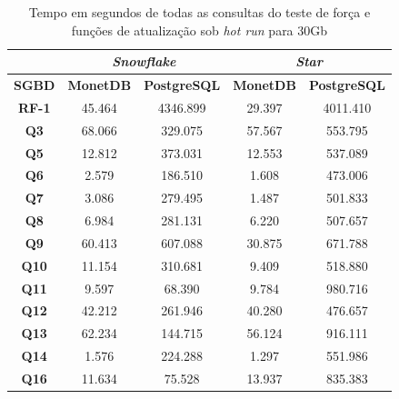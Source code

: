 \begin{table}[t]
        \centering
        \caption{Tempo em segundos de todas as consultas do teste de força e funções de atualização sob \textit{hot run} para 30Gb}
        \label{tab:queries_hot_30}
        \begin{tabular}{|c|c|c|c|c|}
        \hline
                & \multicolumn{2}{c|}{\textit{\textbf{Snowflake}}} & \multicolumn{2}{c|}{\textit{\textbf{Star}}} \\ \hline
        \textbf{SGBD}  & \textbf{MonetDB}      & \textbf{PostgreSQL}      & \textbf{MonetDB}    & \textbf{PostgreSQL}   \\ \hline
        \textbf{RF-1}  & 45.464            & 4346.899            & 29.397           & 4011.410            \\ \hline
        \textbf{Q3}    & 68.066            & 329.075             & 57.567           & 553.795             \\ \hline
        \textbf{Q5}    & 12.812            & 373.031             & 12.553           & 537.089             \\ \hline
        \textbf{Q6}    & 2.579             & 186.510             & 1.608            & 473.006             \\ \hline
        \textbf{Q7}    & 3.086             & 279.495             & 1.487            & 501.833             \\ \hline
        \textbf{Q8}    & 6.984             & 281.131             & 6.220            & 507.657             \\ \hline
        \textbf{Q9}    & 60.413            & 607.088             & 30.875           & 671.788             \\ \hline
        \textbf{Q10}   & 11.154            & 310.681             & 9.409            & 518.880             \\ \hline
        \textbf{Q11}   & 9.597             & 68.390              & 9.784            & 980.716             \\ \hline
        \textbf{Q12}   & 42.212            & 261.946             & 40.280           & 476.657             \\ \hline
        \textbf{Q13}   & 62.234            & 144.715             & 56.124           & 916.111             \\ \hline
        \textbf{Q14}   & 1.576             & 224.288             & 1.297            & 551.986             \\ \hline
        \textbf{Q16}   & 11.634            & 75.528              & 13.937           & 835.383             \\ \hline

\end{tabular}
\end{table}
